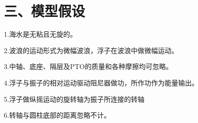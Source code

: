 \documentclass{my_paper}
\begin{document}
  
\section{三、模型假设}
\noindent
1.海水是无粘且无旋的。

\noindent
2.波浪的运动形式为微幅波浪，浮子在波浪中做微幅运动。

\noindent
3.中轴、底座、隔层及PTO的质量和各种摩擦均可忽略。

\noindent
4.浮子与振子的相对运动驱动阻尼器做功，所作功作为能量输出。

\noindent
5.浮子做纵摇运动的旋转轴为振子所连接的转轴

\noindent
6.转轴与圆柱底部的距离忽略不计。



\end{document}
